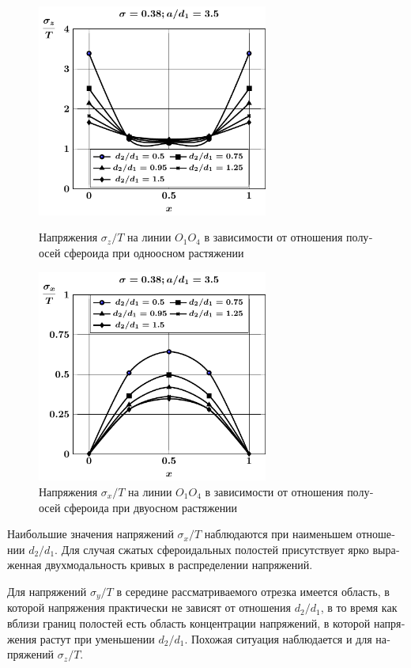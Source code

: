 \begin{russian}
\begin{figure}[h!]
\centering\footnotesize
\parbox[b]{7.5cm}{\centering\includegraphics[width=7.6cm]{cav4-prolate-oblate-a35-t1-sig_z.pdf}
\caption{Напряжения $\sigma_z/T$ на линии $O_1O_4$ в зависимости от отношения полуосей сфероида при одноосном растяжении
\label{f:10:10}}}\hfil\hfil
\parbox[b]{7.5cm}{\centering\includegraphics[width=7.6cm]{cav4-prolate-oblate-a35-t2-sig_x.pdf}
\caption{Напряжения $\sigma_x/T$ на линии $O_1O_4$ в зависимости от отношения полуосей сфероида при двуосном растяжении
\label{f:10:11}}}
\end{figure}

Наибольшие значения напряжений $\sigma_x/T$ наблюдаются при наименьшем отношении $d_2/d_1$. Для случая сжатых сфероидальных полостей присутствует ярко выраженная двухмодальность кривых в распределении напряжений.

Для напряжений $\sigma_y/T$ в середине рассматриваемого отрезка имеется область, в которой напряжения практически не зависят от отношения $d_2/d_1$, в то время как вблизи границ полостей есть область концентрации напряжений, в которой напряжения растут при уменьшении $d_2/d_1$. Похожая ситуация наблюдается и для напряжений $\sigma_z/T$.


\end{russian}
